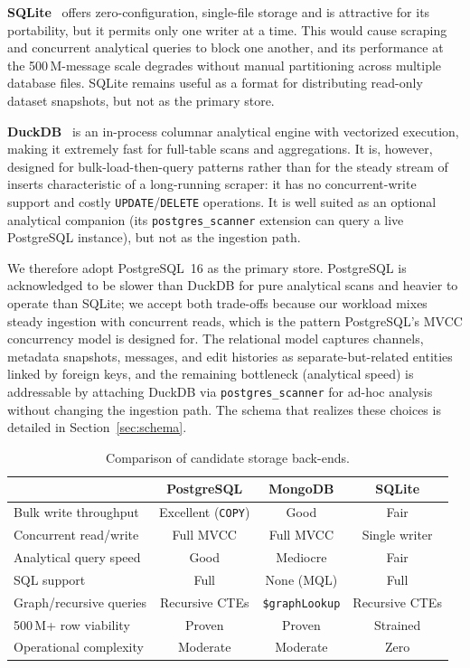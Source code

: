 \textbf{SQLite}~\cite{sqlite2026} offers zero-configuration, single-file storage and is attractive for its portability, but it permits only one writer at a time. This would cause scraping and concurrent analytical queries to block one another, and its performance at the 500\,M-message scale degrades without manual partitioning across multiple database files. SQLite remains useful as a format for distributing read-only dataset snapshots, but not as the primary store.

\textbf{DuckDB}~\cite{duckdb2019} is an in-process columnar analytical engine with vectorized execution, making it extremely fast for full-table scans and aggregations. It is, however, designed for bulk-load-then-query patterns rather than for the steady stream of inserts characteristic of a long-running scraper: it has no concurrent-write support and costly \texttt{UPDATE}/\texttt{DELETE} operations. It is well suited as an optional analytical companion (its \texttt{postgres\_scanner} extension can query a live PostgreSQL instance), but not as the ingestion path.

We therefore adopt PostgreSQL~16 as the primary store. PostgreSQL is acknowledged to be slower than DuckDB for pure analytical scans and heavier to operate than SQLite; we accept both trade-offs because our workload mixes steady ingestion with concurrent reads, which is the pattern PostgreSQL's MVCC concurrency model is designed for. The relational model captures channels, metadata snapshots, messages, and edit histories as separate-but-related entities linked by foreign keys, and the remaining bottleneck (analytical speed) is addressable by attaching DuckDB via \texttt{postgres\_scanner} for ad-hoc analysis without changing the ingestion path. The schema that realizes these choices is detailed in Section~\ref{sec:schema}.

\begin{table}[htbp]
\centering
\caption{Comparison of candidate storage back-ends.}
\label{tab:db-comparison}
\small
\begin{tabular}{@{}lccc@{}}
\toprule
 & \textbf{PostgreSQL} & \textbf{MongoDB} & \textbf{SQLite} \\
\midrule
Bulk write throughput   & Excellent (\texttt{COPY}) & Good            & Fair           \\
Concurrent read/write   & Full MVCC                 & Full MVCC       & Single writer  \\
Analytical query speed  & Good                      & Mediocre        & Fair           \\
SQL support             & Full                      & None (MQL)      & Full           \\
Graph/recursive queries & Recursive CTEs            & \texttt{\$graphLookup} & Recursive CTEs \\
500\,M+ row viability   & Proven                    & Proven          & Strained       \\
Operational complexity  & Moderate                  & Moderate        & Zero           \\
\bottomrule
\end{tabular}
\end{table}

